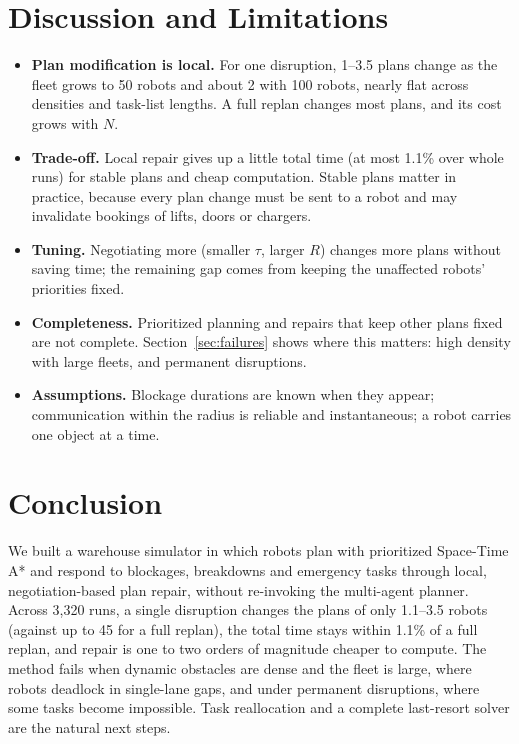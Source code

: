 \documentclass[11pt,a4paper]{article}
\begin{document}
\section{Discussion and Limitations}

\begin{itemize}
  \item \textbf{Plan modification is local.} For one disruption, 1--3.5 plans change as the fleet grows
  to 50 robots and about 2 with 100 robots, nearly flat across densities and task-list lengths. A full
  replan changes most plans, and its cost grows with $N$.
  \item \textbf{Trade-off.} Local repair gives up a little total time (at most 1.1\% over whole runs) for
  stable plans and cheap computation. Stable plans matter in practice, because every plan change must be
  sent to a robot and may invalidate bookings of lifts, doors or chargers.
  \item \textbf{Tuning.} Negotiating more (smaller $\tau$, larger $R$) changes more plans without saving
  time; the remaining gap comes from keeping the unaffected robots' priorities fixed.
  \item \textbf{Completeness.} Prioritized planning and repairs that keep other plans fixed are not
  complete. Section~\ref{sec:failures} shows where this matters: high density with large fleets, and
  permanent disruptions.
  \item \textbf{Assumptions.} Blockage durations are known when they appear; communication within the
  radius is reliable and instantaneous; a robot carries one object at a time.
\end{itemize}

\section{Conclusion}

We built a warehouse simulator in which robots plan with prioritized Space-Time A* and respond to
blockages, breakdowns and emergency tasks through local, negotiation-based plan repair, without
re-invoking the multi-agent planner. Across 3{,}320 runs, a single disruption changes the plans of only
1.1--3.5 robots (against up to 45 for a full replan), the total time stays within 1.1\% of a full replan,
and repair is one to two orders of magnitude cheaper to compute. The method fails when dynamic obstacles
are dense and the fleet is large, where robots deadlock in single-lane gaps, and under permanent
disruptions, where some tasks become impossible. Task reallocation and a complete last-resort solver are
the natural next steps.
\end{document}
